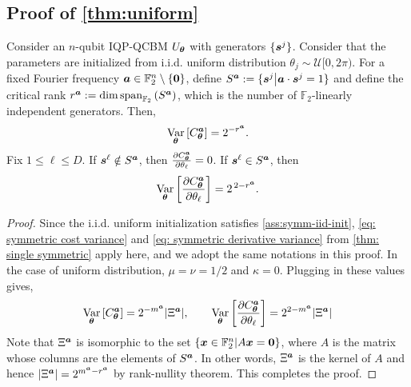 \documentclass[10pt, twocolumn, a4paper]{article}
\theoremstyle{plain}
\theoremstyle{definition}
\theoremstyle{remark}
\begin{document}
\subsection{Proof of \cref{thm:uniform}}
Consider an $n$-qubit IQP-QCBM $U_{\bm{\theta}}$ with generators $\{{\bm{s}^j}\}$. Consider that the parameters are initialized from i.i.d. uniform distribution $\theta_j \sim\mathcal{U}[0,2\pi)$. For a fixed Fourier frequency ${\bm{a}} \in \mathbb{F}_2^n \setminus \{\mathbf{0}\}$, define $S^{{\bm{a}}} := \{ {\bm{s}^j} \big| {\bm{a}} \cdot {\bm{s}^j} = 1 \}$ and define the critical rank $r^{\bm{a}} := \dim \operatorname{span}_{\mathbb{F}_2}\left( S^{{\bm{a}}} \right)$, which is the number of $\mathbb{F}_2$-linearly independent generators. Then, \begin{equation}
\operatorname*{Var}_{{\bm{\theta}}} \left[ C^{\bm{a}}_{\bm{\theta}}\right] = 2^{-r^{\bm{a}}}. 
\end{equation} Fix $1\leq \ell \leq D$. If ${\bm{s}^\ell} \notin S^{\bm{a}}$, then $ \frac{\partial C^{\bm{a}}_{\bm{\theta}}}{\partial \theta_\ell}=0$. If ${\bm{s}^\ell} \in S^{\bm{a}}$, then
\begin{equation}
\operatorname*{Var}_{{\bm{\theta}}} \left[ \frac{\partial C^{\bm{a}}_{\bm{\theta}}}{\partial \theta_\ell} \right] = 2^{\,2-r^{\bm{a}}}. \end{equation}
\begin{proof}
Since the i.i.d. uniform initialization satisfies \cref{ass:symm-iid-init}, \cref{eq: symmetric cost variance} and \cref{eq: symmetric derivative variance} from \cref{thm: single symmetric} apply here, and we adopt the same notations in this proof. In the case of uniform distribution, $\mu = \nu = 1/2$ and $\kappa = 0$. Plugging in these values gives, \begin{equation}
    \operatorname*{Var}_{\bm{\theta}} \left[ C^{\bm{a}}_{\bm{\theta}} \right] = 2^{-m^{\bm{a}}} \abs{\Xi^{\bm{a}}} , \qquad \operatorname*{Var}_{{\bm{\theta}}}\left[\frac{\partial C^{\bm{a}}_{\bm{\theta}}}{\partial\theta_\ell}\right]
= 2^{2-m^{\bm{a}}} \abs{\Xi^{\bm{a}}} 
\end{equation}
Note that $\Xi^{\bm{a}}$ is isomorphic to the set $\{{\bm{x}} \in \mathbb{F}_2^n | A {\bm{x}} = \bm{0}\}$, where $A$ is the matrix whose columns are the elements of $S^{\bm{a}}$. In other words, $\Xi^{\bm{a}}$ is the kernel of $A$ and hence $\abs{\Xi^{\bm{a}}} = 2^{m^{\bm{a}}-r^{\bm{a}}}$ by rank-nullity theorem. This completes the proof.
\end{proof}
\end{document}

